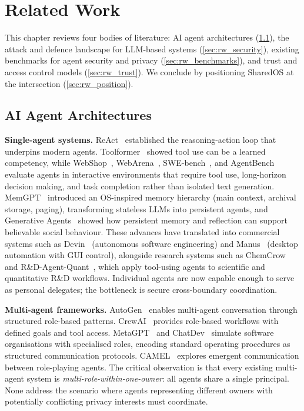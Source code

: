 \chapter{Related Work}
\label{chapter:related_work}

This chapter reviews four bodies of literature: AI agent architectures (\cref{sec:rw_agents}), the attack and defence landscape for LLM-based systems (\cref{sec:rw_security}), existing benchmarks for agent security and privacy (\cref{sec:rw_benchmarks}), and trust and access control models (\cref{sec:rw_trust}). We conclude by positioning SharedOS at the intersection (\cref{sec:rw_position}).


\section{AI Agent Architectures}
\label{sec:rw_agents}

\textbf{Single-agent systems.} ReAct~\cite{yao2023react} established the reasoning-action loop that underpins modern agents. Toolformer~\cite{schick2023toolformer} showed tool use can be a learned competency, while WebShop~\cite{yao2022webshop}, WebArena~\cite{zhou2024webarena}, SWE-bench~\cite{jimenez2024swebench}, and AgentBench~\cite{liu2024agentbench} evaluate agents in interactive environments that require tool use, long-horizon decision making, and task completion rather than isolated text generation. MemGPT~\cite{packer2024memgpt} introduced an OS-inspired memory hierarchy (main context, archival storage, paging), transforming stateless LLMs into persistent agents, and Generative Agents~\cite{park2023generative} showed how persistent memory and reflection can support believable social behaviour. These advances have translated into commercial systems such as Devin~\cite{devin2024} (autonomous software engineering) and Manus~\cite{manus2025} (desktop automation with GUI control), alongside research systems such as ChemCrow~\cite{bran2024chemcrow} and R\&D-Agent-Quant~\cite{li2025rdagentquantmultiagentframeworkdatacentric}, which apply tool-using agents to scientific and quantitative R\&D workflows. Individual agents are now capable enough to serve as personal delegates; the bottleneck is secure cross-boundary coordination.

\textbf{Multi-agent frameworks.} AutoGen~\cite{wu2023autogen} enables multi-agent conversation through structured role-based patterns. CrewAI~\cite{crewai2024} provides role-based workflows with defined goals and tool access. MetaGPT~\cite{hong2023metagpt} and ChatDev~\cite{qian2023chatdev} simulate software organisations with specialised roles, encoding standard operating procedures as structured communication protocols. CAMEL~\cite{li2023camel} explores emergent communication between role-playing agents. The critical observation is that every existing multi-agent system is \textit{multi-role-within-one-owner}: all agents share a single principal. None address the scenario where agents representing different owners with potentially conflicting privacy interests must coordinate.

